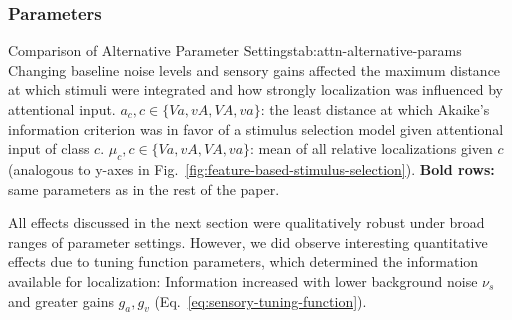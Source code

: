         
    \subsubsection{Parameters}\label{sec:parameters}
        \begin{table}
            \centering
            \begin{subtable}{\textwidth}
                \centering
                \small%
                
                \caption{Alternative Relative Sensory Gains $g_v,g_a$}
                \label{tab:rel-sens-gains}
            \end{subtable}
            \begin{subtable}{\textwidth}
                \centering
                \small%
                
                \caption{Scaled Sensory Gains $g_v,g_a$}
                \label{tab:scaled-sens-gains}
            \end{subtable}
            \begin{subtable}{\textwidth}
                \centering
                \small%
                
                \caption{Alternative Baseline Noise Levels $\nu_s$}
                \label{tab:different-noise-parameters}
            \end{subtable}
            \begin{legend}{Comparison of Alternative Parameter Settings}{tab:attn-alternative-params}
                Changing baseline noise levels and sensory gains affected the maximum distance at which stimuli were integrated and how strongly localization was influenced by attentional input.
                $a_c, c\in\{\mathit{Va},\mathit{vA},\mathit{VA},\mathit{va}\}$: the least distance at which Akaike's information criterion was in favor of a stimulus selection model given attentional input of class $c$.
                $\mu_c, c\in\{\mathit{Va},\mathit{vA},\mathit{VA},\mathit{va}\}$: mean of all relative localizations given $c$ (analogous to y-axes in Fig.~\ref{fig:feature-based-stimulus-selection}).
                \textbf{Bold rows:} same parameters as in the rest of the paper.
            \end{legend}%
        \end{table}

        All effects discussed in the next section were qualitatively robust under broad ranges of parameter settings.
        However, we did observe interesting quantitative effects due to tuning function parameters, which determined the information available for localization:
        Information increased with lower background noise $\nu_s$ and greater gains $g_a, g_v$ (Eq.~\ref{eq:sensory-tuning-function}).

